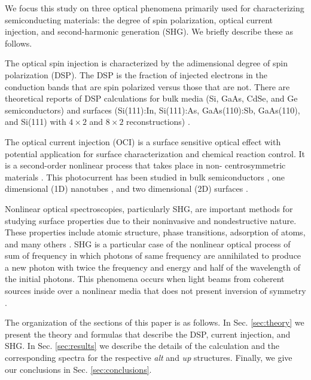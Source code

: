\documentclass[pss]{wiley2sp} %
\begin{document}
We focus this study on three optical phenomena primarily used for
characterizing semiconducting materials: the degree of spin polarization,
optical current injection, and second-harmonic generation (SHG). We briefly
describe these as follows.

The optical spin injection is characterized by the adimensional degree of spin
polarization (DSP). The DSP is the fraction of injected electrons in the
conduction bands that are spin polarized versus those that are not. There are
theoretical reports of DSP calculations for bulk media (Si, GaAs, CdSe, and Ge
semiconductors) \cite{nastos2007full,cabellos2009stress,rioux2010optical} and
surfaces (Si(111):In, Si(111):As, GaAs(110):Sb, GaAs(110), and Si(111) with
$4\times2$ and $8\times2$ reconstructions)
\cite{mendoza2012optical,arzate2014optical}.

The optical current injection (OCI) is a surface sensitive optical effect with
potential application for surface characterization and chemical reaction
control. It is a second-order nonlinear process that takes place in non-
centrosymmetric materials \cite{nastos2006optical,cabellos2011optical,%
bhat2005excitonic,fraser1999quantum}. This photocurrent has been studied in
bulk semiconductors \cite{atanasov1996coherent,sipe2000second}, one
dimensional (1D) nanotubes \cite{mele2000coherent,kral2000photogalvanic}, and
two dimensional (2D) surfaces \cite{mele2000coherent,cabellos2011optical}.

Nonlinear optical spectroscopies, particularly SHG, are important methods for studying surface properties due to their noninvasive and nondestructive nature. These properties include atomic structure, phase transitions, adsorption of atoms, and many others \cite{dadap1997second,daum1993identification,mcgilp1994probing,power1995resonant,godefroy1996electric,salazar2014molecular,chen1981surface,mendoza1998microscopic}. SHG is a particular case of the nonlinear optical process of sum of frequency in which photons of same frequency are annihilated to produce a new photon with twice the frequency and energy and half of the wavelength of the initial photons. This phenomena occurs when light beams from coherent sources inside over a nonlinear media that does not present inversion of symmetry \cite{bloembergen1962light,andersonPRB15,sipe2000second}.

The organization of the sections of this paper is as follows. In Sec. \ref{sec:theory} we present the theory and formulas that describe the DSP, current injection, and SHG. In Sec. \ref{sec:results} we describe the details of the calculation and the corresponding spectra for the respective \emph{alt} and \emph{up} structures. Finally, we give our conclusions in Sec. \ref{sec:conclusions}.
\end{document}
